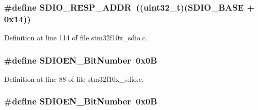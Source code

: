 \subsubsection[{\texorpdfstring{S\+D\+I\+O\+\_\+\+R\+E\+S\+P\+\_\+\+A\+D\+DR}{SDIO_RESP_ADDR}}]{\setlength{\rightskip}{0pt plus 5cm}\#define S\+D\+I\+O\+\_\+\+R\+E\+S\+P\+\_\+\+A\+D\+DR~(({\bf uint32\+\_\+t})({\bf S\+D\+I\+O\+\_\+\+B\+A\+SE} + 0x14))}\hypertarget{group___s_d_i_o___private___types_definitions_ga4285ce49b005e3d03ddf9fdc491c4d70}{}\label{group___s_d_i_o___private___types_definitions_ga4285ce49b005e3d03ddf9fdc491c4d70}


Definition at line 114 of file stm32f10x\+\_\+sdio.\+c.

\subsubsection[{\texorpdfstring{S\+D\+I\+O\+E\+N\+\_\+\+Bit\+Number}{SDIOEN_BitNumber}}]{\setlength{\rightskip}{0pt plus 5cm}\#define S\+D\+I\+O\+E\+N\+\_\+\+Bit\+Number~0x0B}\hypertarget{group___s_d_i_o___private___types_definitions_ga37f3e1612e0dae8160be978ebfa54301}{}\label{group___s_d_i_o___private___types_definitions_ga37f3e1612e0dae8160be978ebfa54301}


Definition at line 88 of file stm32f10x\+\_\+sdio.\+c.

\subsubsection[{\texorpdfstring{S\+D\+I\+O\+E\+N\+\_\+\+Bit\+Number}{SDIOEN_BitNumber}}]{\setlength{\rightskip}{0pt plus 5cm}\#define S\+D\+I\+O\+E\+N\+\_\+\+Bit\+Number~0x0B}\hypertarget{group___s_d_i_o___private___types_definitions_ga37f3e1612e0dae8160be978ebfa54301}{}\label{group___s_d_i_o___private___types_definitions_ga37f3e1612e0dae8160be978ebfa54301}


